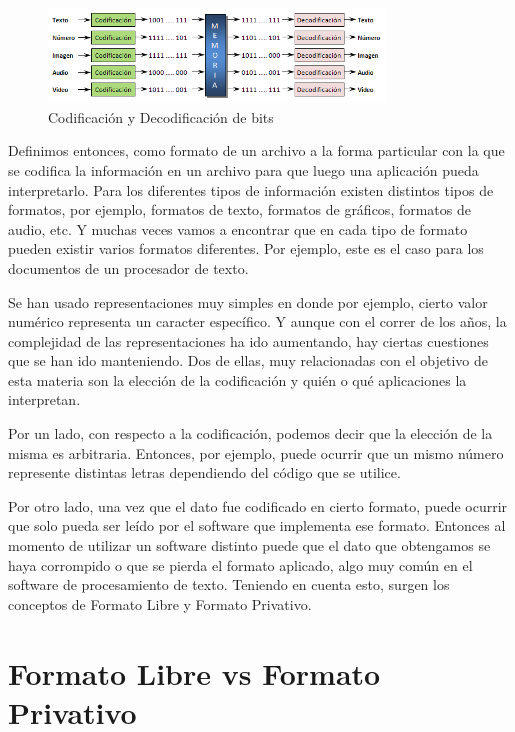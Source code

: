 \documentclass[12pt]{article}
\begin{document}
\begin{figure}[h]
\centering
\includegraphics[width=0.8\textwidth]{patrones_bits.png}
\renewcommand{\figurename}{Fig.}
\caption{Codificación y Decodificación de bits\protect\footnotemark}
\label{contexto:figura}
\end{figure}

Definimos entonces, como formato de un archivo a la forma particular con la que se codifica la información en un archivo para que luego una aplicación pueda interpretarlo. Para los diferentes tipos de información existen distintos tipos de formatos, por ejemplo, formatos de texto, formatos de gráficos, formatos de audio, etc. Y muchas veces vamos a encontrar que en cada tipo de formato pueden existir varios formatos diferentes. Por ejemplo, este es el caso para los documentos de un procesador de texto.

Se han usado representaciones muy simples en donde por ejemplo, cierto valor numérico representa un caracter específico. Y aunque con el correr de los años, la complejidad de las representaciones ha ido aumentando, hay ciertas cuestiones que se han ido manteniendo. Dos de ellas, muy relacionadas con el objetivo de esta materia son la elección de la codificación y quién o qué aplicaciones la interpretan. 

Por un lado, con respecto a la codificación, podemos decir que la elección de la misma es arbitraria. Entonces, por ejemplo, puede ocurrir que un mismo número represente distintas letras dependiendo del código que se utilice. 

Por otro lado, una vez que el dato fue codificado en cierto formato, puede ocurrir que solo pueda ser leído por el software que implementa ese formato. Entonces al momento de utilizar un software distinto puede que el dato que obtengamos se haya corrompido o que se pierda el formato aplicado, algo muy común en el software de procesamiento de texto. Teniendo en cuenta esto, surgen los conceptos de Formato Libre y Formato Privativo.

\section*{Formato Libre vs Formato Privativo}
\end{document}
